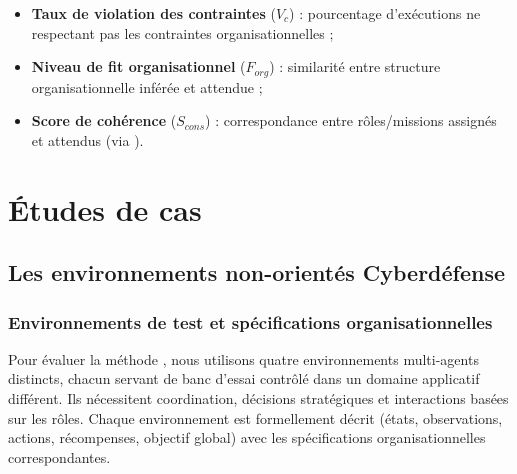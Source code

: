 \begin{itemize}
    \item \textbf{Taux de violation des contraintes} ($V_c$) : pourcentage d'exécutions ne respectant pas les contraintes organisationnelles ;
    \item \textbf{Niveau de fit organisationnel} ($F_{org}$) : similarité entre structure organisationnelle inférée et attendue ;
    \item \textbf{Score de cohérence} ($S_{cons}$) : correspondance entre rôles/missions assignés et attendus (via ).
\end{itemize}



\chapter{Études de cas}
\section{Les environnements non-orientés Cyberdéfense}

\subsection{Environnements de test et spécifications organisationnelles}

Pour évaluer la méthode , nous utilisons quatre environnements multi-agents distincts, chacun servant de banc d'essai contrôlé dans un domaine applicatif différent. Ils nécessitent coordination, décisions stratégiques et interactions basées sur les rôles. Chaque environnement est formellement décrit (états, observations, actions, récompenses, objectif global) avec les spécifications organisationnelles correspondantes.

